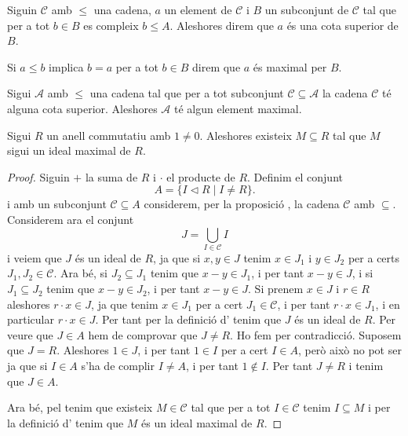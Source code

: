 \documentclass[../../Main.tex]{subfiles}
\begin{document}
	\begin{definition}
		\label{def:cota superior d'una cadena}
		\label{def:element maximal d'una cadena}
		Siguin \(\mathcal{C}\) amb \(\leq\) una cadena, \(a\) un element de \(\mathcal{C}\) i \({B}\) un subconjunt de \(\mathcal{C}\) tal que per a tot \(b\in{B}\) es compleix \(b\leq A\). Aleshores direm que \(a\) és una cota superior de \({B}\).
		
		Si \(a\leq b\) implica \(b=a\) per a tot \(b\in{B}\) direm que \(a\) és maximal per \({B}\).
	\end{definition}
	\begin{axiom}
		\label{lema de Zorn}
		Sigui \(\mathcal{A}\) amb \(\leq\) una cadena tal que per a tot subconjunt \(\mathcal{C}\subseteq\mathcal{A}\) la cadena \(\mathcal{C}\) té alguna cota superior. Aleshores \(\mathcal{A}\) té algun element maximal.
	\end{axiom}
	\begin{theorem}
		\label{thm:ideal maximal exsiteix}
		Sigui \(R\) un anell commutatiu amb \(1\neq0\). Aleshores existeix \(M\subseteq R\) tal que \(M\) sigui un ideal maximal de \(R\).
		\begin{proof}
			Siguin \(+\) la suma de \(R\) i \(\cdot\) el producte de \(R\). Definim el conjunt
			\[A=\{I\triangleleft R\mid I\neq R\}.\]
			i amb un subconjunt \(\mathcal{C}\subseteq A\) considerem, per la proposició , la cadena \(\mathcal{C}\) amb \(\subseteq\). Considerem ara el conjunt
			\[J=\bigcup_{I\in\mathcal{C}}I\]
			i veiem que \(J\) és un ideal de \(R\), ja que si \(x,y\in J\) tenim \(x\in J_{1}\) i \(y\in J_{2}\) per a certs \(J_{1},J_{2}\in\mathcal{C}\). Ara bé, si \(J_{2}\subseteq J_{1}\) tenim que \(x-y\in J_{1}\), i per tant \(x-y\in J\), i si \(J_{1}\subseteq J_{2}\) tenim que \(x-y\in J_{2}\), i per tant \(x-y\in J\). Si prenem \(x\in J\) i \(r\in R\) aleshores \(r\cdot x\in J\), ja que tenim \(x\in J_{1}\) per a cert \(J_{1}\in\mathcal{C}\), i per tant \(r\cdot x\in J_{1}\), i en particular \(r\cdot x\in J\). Per tant per la definició d' tenim que \(J\) és un ideal de \(R\). Per veure que \(J\in A\) hem de comprovar que \(J\neq R\). Ho fem per contradicció. Suposem que \(J=R\). Aleshores \(1\in J\), i per tant \(1\in I\) per a cert \(I\in A\), però això no pot ser ja que si \(I\in A\) s'ha de complir \(I\neq A\), i per tant \(1\notin I\). Per tant \(J\neq R\) i tenim que \(J\in A\).
			
			Ara bé, pel  tenim que existeix \(M\in\mathcal{C}\) tal que per a tot \(I\in\mathcal{C}\) tenim \(I\subseteq M\) i per la definició d' tenim que \(M\) és un ideal maximal de \(R\).
		\end{proof}
	\end{theorem}
\end{document}
